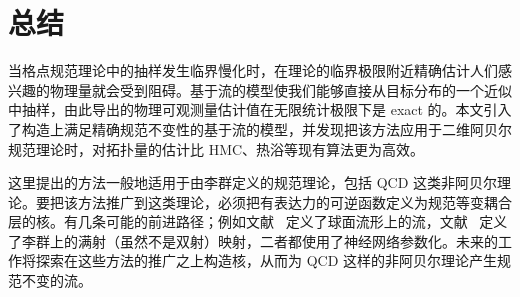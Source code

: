\section{总结}
当格点规范理论中的抽样发生临界慢化时，在理论的临界极限附近精确估计人们感兴趣的物理量就会受到阻碍。基于流的模型使我们能够直接从目标分布的一个近似中抽样，由此导出的物理可观测量估计值在无限统计极限下是 exact 的。本文引入了构造上满足精确规范不变性的基于流的模型，并发现把该方法应用于二维阿贝尔规范理论时，对拓扑量的估计比 HMC、热浴等现有算法更为高效。

这里提出的方法一般地适用于由李群定义的规范理论，包括 QCD 这类非阿贝尔理论。要把该方法推广到这类理论，必须把有表达力的可逆函数定义为规范等变耦合层的核。有几条可能的前进路径；例如文献~\cite{rezende2020normalizing} 定义了球面流形上的流，文献~\cite{falorsi19lie} 定义了李群上的满射（虽然不是双射）映射，二者都使用了神经网络参数化。未来的工作将探索在这些方法的推广之上构造核，从而为 QCD 这样的非阿贝尔理论产生规范不变的流。
